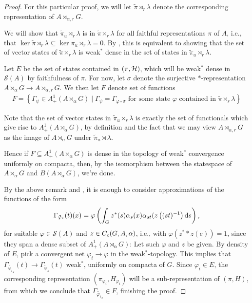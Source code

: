 \begin{proof}
For this particular proof, we will let $\tilde \pi \rtimes_r \lambda$ denote the corresponding representation of $A \rtimes_{\alpha,r}G$.

We will show that $\tilde \pi_u \rtimes_r \lambda$ is  in $\tilde \pi \rtimes_r \lambda$ for all faithful representations $\pi$ of $A$, i.e., that $\ker \tilde \pi \rtimes_r \lambda \subseteq \ker \pi_u \rtimes_r \lambda = 0$. By \cite[80]{dixmier1969c}, this is equivalent to showing that the set of vector states of $\tilde \pi \rtimes_r \lambda$ is weak$^*$ dense in the set of states in $\tilde \pi_u \rtimes_r \lambda$.

Let $E$ be the set of states contained in $(\pi,\mathcal{H})$, which will be weak$^*$ dense in $\mathcal{S}(A)$ by faithfulness of $\pi$. For now, let $\sigma$ denote the surjective $*$-representation $A \rtimes_\alpha G \to A \rtimes_{\alpha,r}G$. We then let $F$ denote set of functions
\begin{align*}
	F = \left\{  \Gamma_\psi \in A_+^1(A\rtimes_\alpha G) \mid \Gamma_\psi = \Gamma_{\varphi \circ \sigma} \text{ for some state } \varphi \text{ contained in } \tilde \pi \rtimes_r \lambda \right\}
\end{align*}

Note that the set of vector states in $\tilde \pi_u \rtimes_r \lambda$ is exactly the set of functionals which give rise to $A_+^1(A \rtimes_\alpha G)$, by definition and the fact that we may view $A \rtimes_{\alpha,r} G$ as the image of $A \rtimes_\alpha G$ under $\tilde \pi_u \rtimes \lambda$.

Hence if $F \subseteq A_+^1(A \rtimes_\alpha G)$ is dense in the topology of weak$^*$ convergence uniformly on compacta, then, by the isomorphism between the statespace of $A \rtimes_\alpha G$ and $B(A \rtimes_\alpha G)$, we're done.

By the above remark and , it is enough to consider approximations of the functions of the form
\begin{align*}
	\Gamma_{\tilde \varphi_z}(t) (x) =\varphi\left( \int_G z^*(s) \alpha_s(x) \alpha_{st}(z\left( (st)^{-1} \right)\mathrm{d} s \right),
\end{align*}
for suitable $\varphi \in \mathcal{S}(A)$ and $z \in C_c(G,A,\alpha)$, i.e., with $\varphi(z^* \ast z(e)) = 1$, since they span a dense subset of $A_+^1(A \rtimes_\alpha G)$: Let such $\varphi$ and $z$ be given. By density of $E$, pick a convergent net $\varphi_i \to \varphi$ in the weak$^*$-topology. This implies that $\Gamma_{\tilde {\varphi_i}_z}(t) \to \Gamma_{\tilde \varphi_z}(t)$ weak$^*$, uniformly on compacta of $G$. Since $\varphi_i \in E$, the corresponding representation $(\pi_{\varphi_i},H_{\varphi_i})$ will be a sub-representation of $(\pi,H)$, from which we conclude that $\Gamma_{\tilde {\varphi_i}_z} \in F$, finishing the proof.
\end{proof}
